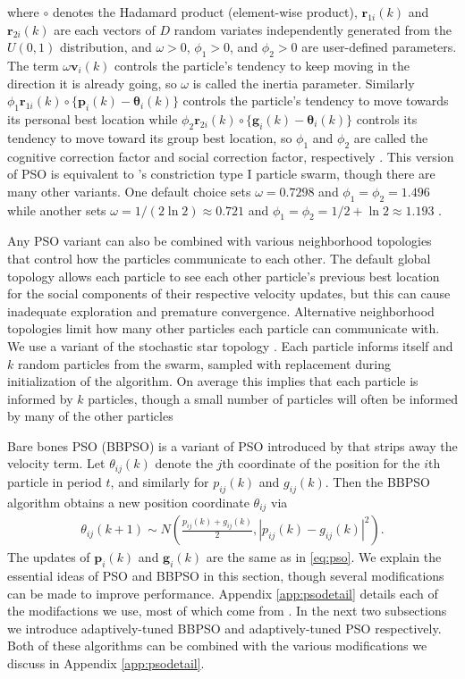 \documentclass[cmbright]{staauth}
\begin{document}
where $\circ$ denotes the Hadamard product (element-wise product), $\bm{r}_{1i}(k)$ and $\bm{r}_{2i}(k)$ are each vectors of $D$ random variates independently generated from the $U(0,1)$ distribution, and $\omega>0$, $\phi_1>0$, and $\phi_2>0$ are user-defined parameters. The term $\omega \bm{v}_i(k)$ controls the particle's tendency to keep moving in the direction it is already going, so $\omega$ is called the inertia parameter. Similarly $\phi_1 \bm{r}_{1i}(k)\circ\{\bm{p}_i(k) - \bm{\theta}_i(k)\}$ controls the particle's tendency to move towards its personal best location while $\phi_2 \bm{r}_{2i}(k)\circ\{\bm{g}_i(k) - \bm{\theta}_i(k)\}$ controls its tendency to move toward its group best location, so $\phi_1$ and $\phi_2$ are called the cognitive correction factor and social correction factor, respectively \citep{blum2008swarm}. This version of PSO is equivalent to \citet{clerc2002particle}'s constriction type I particle swarm, though there are many other variants. One default choice sets $\omega = 0.7298$ and $\phi_1 = \phi_2 = 1.496$ \citep{clerc2002particle} while another sets $\omega = 1/(2\ln 2)\approx 0.721$ and $\phi_1=\phi_2=1/2 + \ln 2\approx 1.193$ \citep{clerc2006stagnation}.

Any PSO variant can also be combined with various neighborhood topologies that control how the particles communicate to each other. The default global topology allows each particle to see each other particle's previous best location for the social components of their respective velocity updates, but this can cause inadequate exploration and premature convergence. Alternative neighborhood topologies limit how many other particles each particle can communicate with. We use a variant of the stochastic star topology \citep{miranda2008stochastic}. Each particle informs itself and $k$ random particles from the swarm, sampled with replacement during initialization of the algorithm. On average this implies that each particle is informed by $k$ particles, though a small number of particles will often be informed by many of the other particles

Bare bones PSO (BBPSO) is a variant of PSO introduced by \citet{kennedy2003bare} that strips away the velocity term. Let $\theta_{ij}(k)$ denote the $j$th coordinate of the position for the $i$th particle in period $t$, and similarly for $p_{ij}(k)$ and $g_{ij}(k)$. Then the BBPSO algorithm obtains a new position coordinate $\theta_{ij}$ via
\begin{align}\label{eq:bbpso}
\theta_{ij}(k+1) \sim N\left(\frac{p_{ij}(k) + g_{ij}(k)}{2}, |p_{ij}(k) - g_{ij}(k)|^2\right).
\end{align}
The updates of $\bm{p}_i(k)$ and $\bm{g}_i(k)$ are the same as in \eqref{eq:pso}. We explain the essential ideas of PSO and BBPSO in this section, though several modifications can be made to improve performance. Appendix \ref{app:psodetail} details each of the modifactions we use, most of which come from \citet{clerc2011spso}. In the next two subsections we introduce adaptively-tuned BBPSO and adaptively-tuned PSO respectively. Both of these algorithms can be combined with the various modifications we discuss in Appendix \ref{app:psodetail}.
\end{document}
